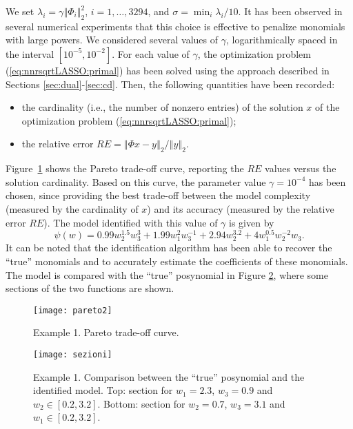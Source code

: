 \documentclass[11pt]{article}
\begin{document}
We set $\lambda_{i}=\gamma\left\Vert \Phi_{i}\right\Vert _{2}^{2}$,
$i=1,\ldots,3294$, and $\sigma=\min_{i}\lambda_{i}/10$. It has been
observed in several numerical experiments that this choice is effective
to penalize monomials with large powers. We considered several values
of $\gamma$, logarithmically spaced in the interval $[10^{-5},10^{-2}]$.
For each value of $\gamma$, the optimization problem (\ref{eq:nnrsqrtLASSO:primal})
has been solved using the approach described in Sections \ref{sec:dual}-\ref{sec:cd}.
Then, the following quantities have been recorded: 
\begin{itemize}
\item the cardinality (i.e., the number of nonzero entries) of the solution
$x$ of the optimization problem (\ref{eq:nnrsqrtLASSO:primal}); 
\item the relative error $RE=\left\Vert \Phi x-y\right\Vert _{2}/\left\Vert y\right\Vert _{2}$. 
\end{itemize}
\noindent Figure~\ref{pareto:figure} shows the Pareto trade-off curve,
reporting the $RE$ values versus the solution cardinality. Based
on this curve, the parameter value $\gamma=10^{-4}$ has been chosen,
since providing the best trade-off between the model complexity (measured
by the cardinality of $x$) and its accuracy (measured by the relative
error $RE$). The model identified with this value of $\gamma$ is
given by
\[
\psi(w)=0.99w_{2}^{1.5}w_{3}^{3}+1.99w_{1}^{2}w_{3}^{-1}+2.94w_{2}^{3.2}+4w_{1}^{0.5}w_{2}^{-2}w_{3}.
\]
It can be noted that the identification algorithm has been able to
recover the ``true'' monomials and to accurately estimate the coefficients
of these monomials. The model is compared with the ``true'' posynomial
in Figure \ref{sezioni}, where some sections of the two functions
are shown.

\begin{figure}
\centering\texttt{[image: pareto2]}

\caption{Example 1. Pareto trade-off curve.\label{pareto:figure}}
\end{figure}


\begin{figure}
\centering\texttt{[image: sezioni]}

\caption{Example 1. Comparison between the ``true'' posynomial and the identified
model. Top: section for $w_{1}=2.3$, $w_{3}=0.9$ and $w_{2}\in[0.2,3.2]$.
Bottom: section for $w_{2}=0.7$, $w_{3}=3.1$ and $w_{1}\in[0.2,3.2]$.
\label{sezioni}}


\end{figure}
\end{document}
